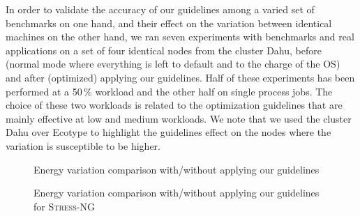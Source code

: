 In order to validate the accuracy of our guidelines among a varied set of benchmarks on one hand, and their effect on the variation between identical machines on the other hand, we ran seven experiments with benchmarks and real applications on a set of four identical nodes from the cluster \textsf{Dahu}, before (\textsf{normal} mode where everything is left to default and to the charge of the OS) and after (\textsf{optimized}) applying our guidelines.
Half of these experiments has been performed at a 50\,\% workload and the other half on single process jobs.
The choice of these two workloads is related to the optimization guidelines that are mainly effective at low and medium workloads.
We note that we used the cluster \textsf{Dahu} over \textsf{Ecotype} to highlight the guidelines effect on the nodes where the variation is susceptible to be higher.

\begin{figure}%
    \caption{Energy variation comparison with/without applying our guidelines}\label{fig:optimized}
\end{figure}

\begin{figure}%
    \caption{Energy variation comparison with/without applying our guidelines for \textsc{Stress-NG}}\label{fig:stress}
\end{figure}

